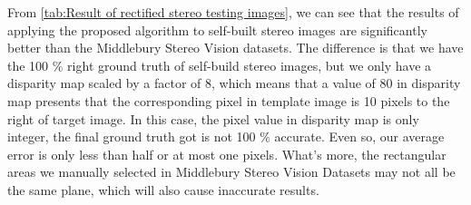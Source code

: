 From \cref{tab:Result of rectified stereo testing images}, we can see that the results of applying the proposed algorithm to self-built stereo images are significantly better than the Middlebury Stereo Vision datasets. The difference is that we have the 100 $\%$ right ground truth of self-build stereo images,  but we only have a disparity map scaled by a factor of 8, which means that a value of 80 in disparity map presents that the corresponding pixel in template image is 10 pixels to the right of target image. In this case, the pixel value in disparity map is only integer, the final ground truth got is not 100 $\%$ accurate. Even so, our average error is only less than half or at most one pixels. What's more, the rectangular areas we manually selected in Middlebury Stereo Vision Datasets may not all be the same plane, which will also cause inaccurate results.


